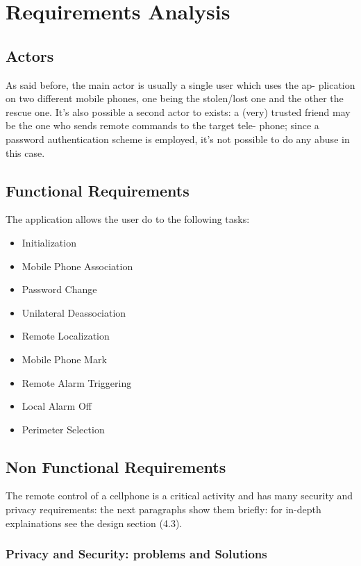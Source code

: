 \chapter{Requirements Analysis}
\label{cap:RequirementsAnalysis} 


\section{Actors}

As said before, the main actor is usually a single user which uses the ap-
plication on two different mobile phones, one being the stolen/lost one and
the other the rescue one. It’s also possible a second actor to exists: a (very)
trusted friend may be the one who sends remote commands to the target tele-
phone; since a password authentication scheme is employed, it’s not possible
to do any abuse in this case.

\section{Functional Requirements}

The application allows the user do to the following tasks:

\begin{itemize}
 \item Initialization
 \item Mobile Phone Association
 \item Password Change
 \item Unilateral Deassociation
 \item Remote Localization
 \item Mobile Phone Mark
 \item Remote Alarm Triggering
 \item Local Alarm Off
 \item Perimeter Selection
\end{itemize}

\section{Non Functional Requirements}

The remote control of a cellphone is a critical activity and has many security
and privacy requirements: the next paragraphs show them briefly: for in-depth
explainations see the design section (4.3). %

\subsection{Privacy and Security: problems and Solutions}

